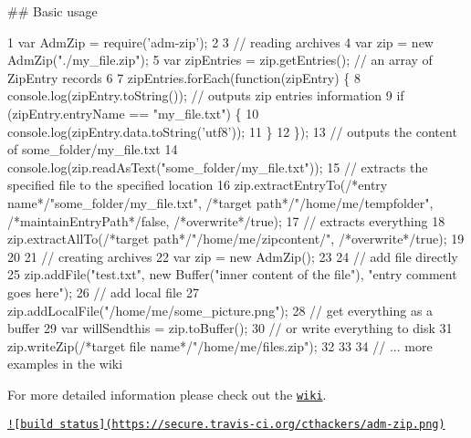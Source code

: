 \#\# Basic usage 
\begin{DoxyCode}
1 var AdmZip = require('adm-zip');
2 
3 // reading archives
4 var zip = new AdmZip("./my\_file.zip");
5 var zipEntries = zip.getEntries(); // an array of ZipEntry records
6 
7 zipEntries.forEach(function(zipEntry) \{
8     console.log(zipEntry.toString()); // outputs zip entries information
9     if (zipEntry.entryName == "my\_file.txt") \{
10          console.log(zipEntry.data.toString('utf8')); 
11     \}
12 \});
13 // outputs the content of some\_folder/my\_file.txt
14 console.log(zip.readAsText("some\_folder/my\_file.txt")); 
15 // extracts the specified file to the specified location
16 zip.extractEntryTo(/*entry name*/"some\_folder/my\_file.txt", /*target path*/"/home/me/tempfolder",
       /*maintainEntryPath*/false, /*overwrite*/true);
17 // extracts everything
18 zip.extractAllTo(/*target path*/"/home/me/zipcontent/", /*overwrite*/true);
19 
20 
21 // creating archives
22 var zip = new AdmZip();
23 
24 // add file directly
25 zip.addFile("test.txt", new Buffer("inner content of the file"), "entry comment goes here");
26 // add local file
27 zip.addLocalFile("/home/me/some\_picture.png");
28 // get everything as a buffer
29 var willSendthis = zip.toBuffer();
30 // or write everything to disk
31 zip.writeZip(/*target file name*/"/home/me/files.zip");
32 
33 
34 // ... more examples in the wiki
\end{DoxyCode}


For more detailed information please check out the \href{https://github.com/cthackers/adm-zip/wiki}{\tt wiki}.

\href{http://travis-ci.org/cthackers/adm-zip}{\tt !\mbox{[}build status\mbox{]}(https\+://secure.\+travis-\/ci.\+org/cthackers/adm-\/zip.\+png)} 